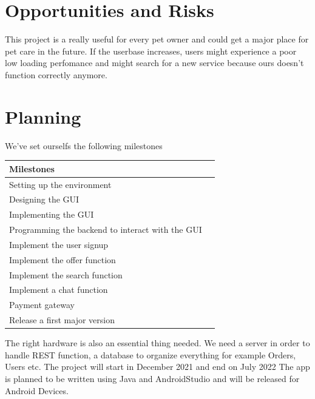 \documentclass[12pt]{article}
\theoremstyle{definition}
\newenvironment{explanation}{%
}{}
\begin{document}
\section{Opportunities and Risks}
\begin{explanation}
This project is a really useful for every pet owner and could get a major place for pet care in the future.
\newline
If the userbase increases, users might experience a poor low loading perfomance and might search for a new service because ours doesn't function correctly anymore.
\end{explanation}
\pagebreak

\section{Planning}
\begin{explanation}
We've set ourselfs the following milestones 
\begin{flushleft}
\begin{tabular}{|l|l|} \hline
Milestones \\ \hline
Setting up the environment \\ \hline
Designing the GUI \\ \hline
Implementing the GUI \\ \hline
Programming the backend to interact with the GUI \\ \hline
Implement the user signup \\ \hline
Implement the offer function \\ \hline
Implement the search function \\ \hline
Implement a chat function \\ \hline
Payment gateway \\ \hline
Release a first major version \\ \hline
\end{tabular}
\end{flushleft}
The right hardware is also an essential thing needed.
\newline
We need a server in order to handle REST function, a database to organize everything for example Orders, Users etc.
\newline
The project will start in December 2021 and end on July 2022
\newline
The app is planned to be written using Java and AndroidStudio and will be released for Android Devices.
\end{explanation}
\end{document}
